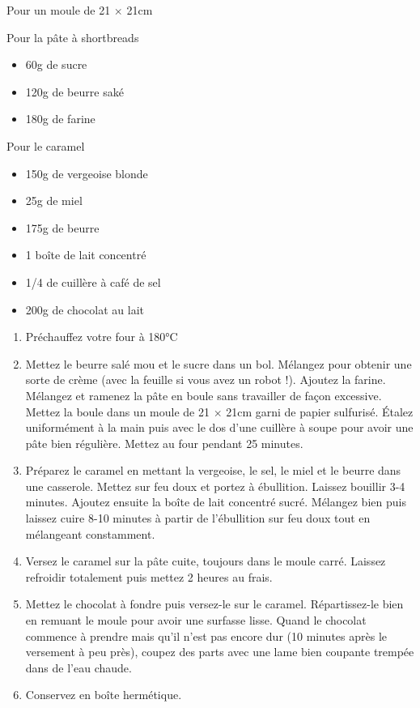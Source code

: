 \medskip
{}
{Pour un moule de 21 $\times$ 21cm}{Pour la pâte à shortbreads\begin{itemize}
\item 60g de sucre
\item 120g de beurre saké
\item 180g de farine
\end{itemize}
Pour le caramel \begin{itemize}
\item 150g de vergeoise blonde
\item 25g de miel
\item 175g de beurre
\item 1 boîte de lait concentré
\item 1/4 de cuillère à café de sel
\item 200g de chocolat au lait
\end{itemize}}
{\begin{enumerate}
\item Préchauffez votre four à 180°C
\item Mettez le beurre salé mou et le sucre dans un bol. Mélangez pour obtenir une sorte de crème (avec la feuille si vous avez un robot !). Ajoutez la farine. Mélangez et ramenez la pâte en boule sans travailler de façon excessive. Mettez la boule dans un moule de 21 $\times$ 21cm garni de papier sulfurisé. Étalez uniformément à la main puis avec le dos d'une cuillère à soupe pour avoir une pâte bien régulière. Mettez au four pendant 25 minutes.
\item Préparez le caramel en mettant la vergeoise, le sel, le miel et le beurre dans une casserole. Mettez sur feu doux et portez à ébullition. Laissez bouillir 3-4 minutes. Ajoutez ensuite la boîte de lait concentré sucré. Mélangez bien puis laissez cuire 8-10 minutes à partir de l'ébullition sur feu doux tout en mélangeant constamment.
\item Versez le caramel sur la pâte cuite, toujours dans le moule carré. Laissez refroidir totalement puis mettez 2 heures au frais.
\item Mettez le chocolat à fondre puis versez-le sur le caramel. Répartissez-le bien en remuant le moule pour avoir une surfasse lisse. Quand le chocolat commence à prendre mais qu'il n'est pas encore dur (10 minutes après le versement à peu près), coupez des parts avec une lame bien coupante trempée dans de l'eau chaude.
\item Conservez en boîte hermétique.
\end{enumerate}}

